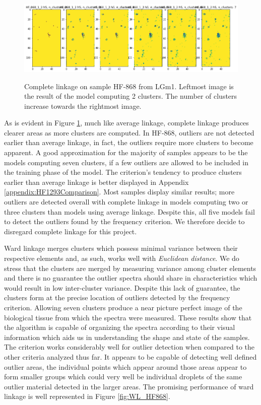 \begin{figure}[H]

    \centering
{\includegraphics[width=13cm]{images/Complete_linkage/LGm-1/HF-868_1_2.h5_0.png} }
\caption{Complete linkage on sample HF-868 from LGm1. Leftmost image is the result of the model computing 2 clusters. The number of clusters increase towards the rightmost image.\label{fig:CL_HF868}}%

\end{figure}

As is evident in Figure \ref{fig:CL_HF868}, much like average linkage, complete linkage produces clearer areas as more clusters are computed. In HF-868, outliers are not detected earlier than average linkage, in fact, the outliers require more clusters to become apparent. A good approximation for the majority of samples appears to be the models computing seven clusters, if a few outliers are allowed to be included in the training phase of the model. The criterion's tendency to produce clusters earlier than average linkage is better displayed in Appendix \ref{appendix:HF1293Comparison}. Most samples display similar results; more outliers are detected overall with complete linkage in models computing two or three clusters than models using average linkage. Despite this, all five models fail to detect the outliers found by the frequency criterion. We therefore decide to disregard complete linkage for this project.

Ward linkage merges clusters which possess minimal variance between their respective elements and, as such, works well with \textit{Euclidean distance}. We do stress that the clusters are merged by measuring variance among cluster elements and there is no guarantee the outlier spectra should share in characteristics which would result in low inter-cluster variance. Despite this lack of guarantee, the clusters form at the precise location of outliers detected by the frequency criterion. Allowing seven clusters produce a near picture perfect image of the biological tissue from which the spectra were measured. These results show that the algorithm is capable of organizing the spectra according to their visual information which aids us in understanding the shape and state of the samples. The criterion works considerably well for outlier detection when compared to the other criteria analyzed thus far. It appears to be capable of detecting well defined outlier areas, the individual points which appear around those areas appear to form smaller groups which could very well be individual droplets of the same outlier material detected in the larger areas. The promising performance of ward linkage is well represented in Figure \ref{fig:WL_HF868}.

